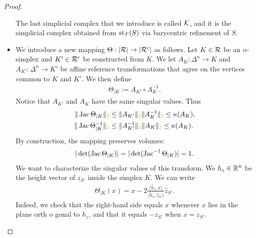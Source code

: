 \documentclass[10pt,letterpaper]{article}
\newcommand\cye[1]{%
  \protect\leavevmode
  \begingroup
    \color{red!35!yellow}%
    #1%
  \endgroup
}
\begin{document}
\begin{proof}
\begin{itemize}
        The last simplicial complex that we introduce is called ${\mathcal K}$,
        and it is the simplicial complex obtained from $\operatorname{st}_{{\mathcal T}}(S)$ via barycentric refinement of $S$. 
        
                
        \item 
        We introduce a new mapping $\Theta : |{\mathcal R}| \rightarrow |{\mathcal R}^c|$ as follows.
        Let $K \in {\mathcal R}$ be an $n$-simplex and $K' \in {\mathcal R}^{c}$ be constructed from $K$.
        We let $A_{K} : \Delta^{n} \rightarrow K$ and $A_{K'} : \Delta^{n} \rightarrow K'$
        be affine reference transformations
        that agree on the vertices common to $K$ and $K'$.
        We then define 
        \begin{align*}
            \Theta_{|K} := A_{K'} \circ A_{K}^{-1}.
        \end{align*}
        Notice that $A_{K'}$ and $A_{K}$ have the same singular values. Thus
        \begin{align*}
            \| \Jacobian \Theta_{|K}      \|_{\cye{2}} &\leq \| A_{K'} \|_{\cye{2}} \| A_{K}^{-1} \|_{\cye{2}} \leq \kappa(A_{K}),
            \\
            \| \Jacobian \Theta_{|K}^{-1} \|_{\cye{2}} &\leq \| A_{K'}^{-1} \|_{\cye{2}} \| A_{K} \|_{\cye{2}} \leq \kappa(A_{K}).
        \end{align*}
        By construction, the mapping preserves volumes:
        \begin{align*}
            |\det( \operatorname{{\rm Jac}}      \Theta_{|K} )|
            = 
            |\det( \operatorname{{\rm Jac}}^{-1} \Theta_{|K} )|
            =
            1
            .
        \end{align*}
        We want to characterize the singular values of this transform. 
        We $h_z \in {\mathbb R}^{n}$ be the height vector of $z_{S'}$ inside the simplex $K$.
        We can write
        \begin{align*}
            \Theta_{|K}(x) 
            = 
            x
            - 
            2 \frac{\langle \hat h_z, x \rangle}{\langle \hat h_z, \hat z_{S'} \rangle}
            \hat z_{S'}
            .
        \end{align*}
        Indeed, we check that the right-hand side equals $x$ whenever $x$ lies in the plane orth\cye{o}gonal to $h_z$,
        and that it equals $-z_{S'}$ when $x = z_{S'}$.

\end{itemize}
\end{proof}
\end{document}

